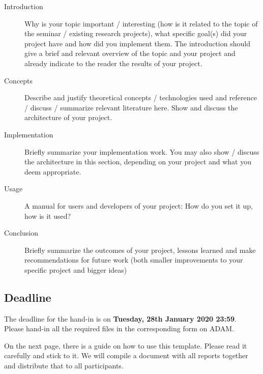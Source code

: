 \begin{description}
    \item[Introduction]  Why is your topic important / interesting (how is it related to the topic of the seminar / existing research projects), what specific goal(s) did your project have and how did you implement them. The introduction should give a brief and relevant overview of the topic and your project and already indicate to the reader the results of your project.
    \item[Concepts] Describe and justify theoretical concepts / technologies used and reference / discuss / summarize relevant literature here. Show and discuss the architecture of your project.
    \item[Implementation] Briefly summarize your implementation work. You may also show / discuss the architecture in this section, depending on your project and what you deem appropriate.
    \item[Usage] A manual for users and developers of your project: How do you set it up, how is it used?
    \item[Conclusion] Briefly summarize the outcomes of your project, lessons learned and make recommendations for future work (both smaller improvements to your specific project and bigger ideas) 
\end{description}

\subsection*{Deadline}

The deadline for the hand-in is on \textbf{Tuesday, 28th January 2020 23:59}.\\
Please hand-in all the required files in the corresponding form on ADAM.


\vspace*{1em}
\noindent 
On the next page, there is a guide on how to use this template. Please read it carefully and stick to it. We will compile a document with all reports together and distribute that to all participants.

\clearpage
\pagebreak